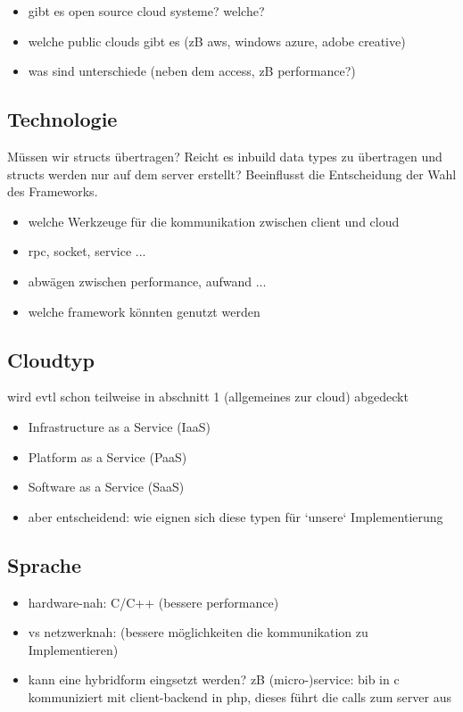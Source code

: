 \documentclass[a4paper,10pt]{article}
\begin{document}
\begin{itemize}
 \item gibt es open source cloud systeme? welche?
 \item welche public clouds gibt es (zB aws, windows azure, adobe creative)
 \item was sind unterschiede (neben dem access, zB performance?)
\end{itemize}

\subsection{Technologie}



Müssen wir structs übertragen?
Reicht es inbuild data types zu übertragen und structs werden nur auf dem server erstellt?
Beeinflusst die Entscheidung der Wahl des Frameworks.

\begin{itemize}
 \item welche Werkzeuge für die kommunikation zwischen client und cloud
 \item rpc, socket, service ...
 \item abwägen zwischen performance, aufwand ...
 \item welche framework könnten genutzt werden
\end{itemize}


\subsection{Cloudtyp}

wird evtl schon teilweise in abschnitt 1 (allgemeines zur cloud) abgedeckt

\begin{itemize}
 \item Infrastructure as a Service (IaaS)
 \item Platform as a Service (PaaS)
 \item Software as a Service (SaaS)
 \item aber entscheidend: wie eignen sich diese typen für `unsere` Implementierung
\end{itemize}

\subsection{Sprache}

\begin{itemize}
 \item hardware-nah: C/C++ (bessere performance)
 \item vs netzwerknah: (bessere möglichkeiten die kommunikation zu Implementieren)
 \item kann eine hybridform eingsetzt werden? 
 zB (micro-)service: bib in c kommuniziert mit client-backend in php, dieses führt die calls zum server aus
\end{itemize}
\end{document}

